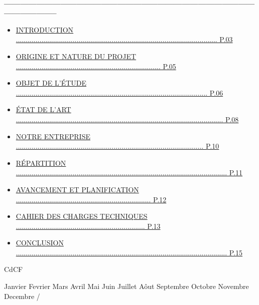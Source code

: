 \newpage
\noindent{}\\
\noindent \textbf {-----------------------------------------------------------------------------------------------------------------}
\begin{itemize}
    \item \hyperref[chapter:introduction]{\uppercase{Introduction  ....................................................................................................... P.03}}
    \item \hyperref[chapter:origine]{\uppercase{Origine et nature du projet .......................................................................... P.05}}
    \item \hyperref[chapter:objet]{\uppercase{objet de l}’\uppercase{étude .................................................................................................. P.06}}
    \item \hyperref[chapter:etat]{\uppercase{état de l}'\uppercase{art .......................................................................................................... P.08}}
    \item \hyperref[chapter:entreprise]{\uppercase{Notre entreprise ................................................................................................ P.10}}
    \item \hyperref[chapter:repartition]{\uppercase{Répartition ............................................................................................................ P.11}}
    \item \hyperref[chapter:planification]{\uppercase{Avancement et planification  ..................................................................... P.12}}
    \item \hyperref[chapter:cdct]{\uppercase{Cahier des charges techniques .................................................................. P.13}}
    \item \hyperref[chapter:Conclusion]{\uppercase{Conclusion ............................................................................................................ P.15}}
\end{itemize} 

\vspace{10cm}

\begin{center}
\vfill
\vspace{0.2cm}

CdCF \\

\newcommand{\mes}{\ifcase\month\or 
    Janvier \or Fevrier \or Mars \or Avril \or Mai \or Juin \or 
    Juillet \or Aôut \or Septembre \or Octobre \or Novembre \or 
    Decembre \fi} 
    
\def\ano{\expandafter\YEAR\the\year}
\def\YEAR#1#2#3#4{#1#2#3#4}
    
{ \mes / \ano}
\end{center}